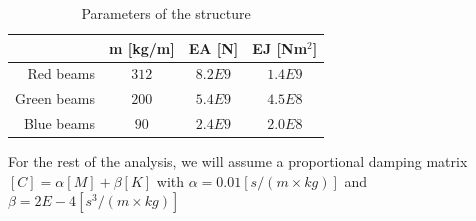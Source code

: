 \begin{table}[H]
    \centering
    \begin{tabular}{|r|c|c|c|}
        \hline
        ~           & \textbf{m [kg/m]} & \textbf{EA [N]} & \textbf{EJ [Nm$^2$]} \\
        \hline
        Red beams   & $312$             & $8.2E9$         & $1.4E9$              \\
        Green beams & $200$             & $5.4E9$         & $4.5E8$              \\
        Blue beams  & $90$              & $2.4E9$         & $2.0E8$              \\
        \hline
    \end{tabular}
    \caption{Parameters of the structure}
    \label{tab:parameters}
\end{table}

For the rest of the analysis, we will assume a proportional damping matrix $[C] = \alpha [M] + \beta [K]$ with $\alpha = 0.01 [s/(m \times kg)]$ and $\beta = 2E-4 [s^3 / (m \times kg)]$